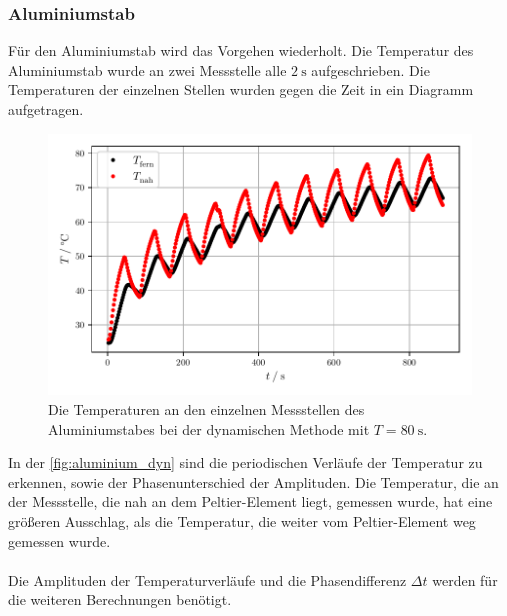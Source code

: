 \subsubsection{Aluminiumstab}
Für den Aluminiumstab wird das Vorgehen wiederholt.
Die Temperatur des Aluminiumstab wurde an zwei Messstelle alle $\SI{2}{\second}$ aufgeschrieben.
Die Temperaturen der einzelnen Stellen wurden gegen die Zeit in ein Diagramm aufgetragen.
\begin{figure}[H]
  \centering
  \includegraphics{build/plot_aluminium.pdf}
  \caption{Die Temperaturen an den einzelnen Messstellen des Aluminiumstabes bei der dynamischen Methode mit $T=\SI{80}{\second}$.}
  \label{fig:aluminium_dyn}
\end{figure}
In der \autoref{fig:aluminium_dyn} sind die periodischen Verläufe der Temperatur zu erkennen, sowie der Phasenunterschied der Amplituden.
Die Temperatur, die an der Messstelle, die nah an dem Peltier-Element liegt, gemessen wurde, hat eine größeren Ausschlag, als die Temperatur, die weiter vom Peltier-Element weg gemessen wurde.
\\
\\
Die Amplituden der Temperaturverläufe und die Phasendifferenz $\Delta t$ werden für die weiteren Berechnungen benötigt.
